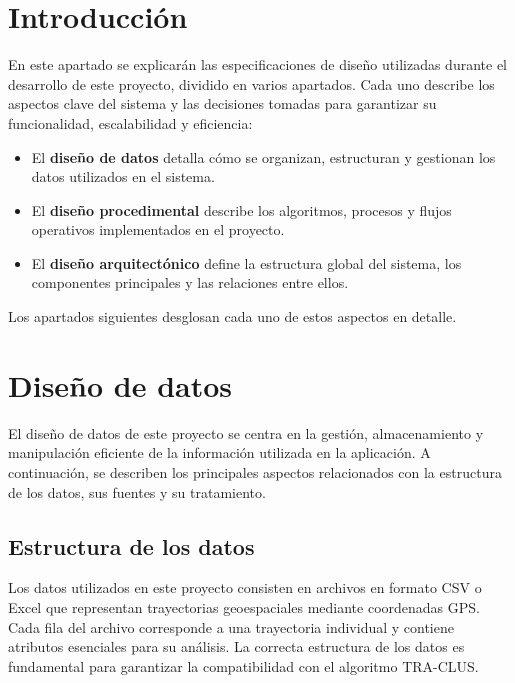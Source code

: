
\section{Introducción}

En este apartado se explicarán las especificaciones de diseño utilizadas durante el desarrollo de este proyecto, dividido en varios apartados. Cada uno describe los aspectos clave del sistema y las decisiones tomadas para garantizar su funcionalidad, escalabilidad y eficiencia:

\begin{itemize}
    \item El \textbf{diseño de datos} detalla cómo se organizan, estructuran y gestionan los datos utilizados en el sistema.
    \item El \textbf{diseño procedimental} describe los algoritmos, procesos y flujos operativos implementados en el proyecto.
    \item El \textbf{diseño arquitectónico} define la estructura global del sistema, los componentes principales y las relaciones entre ellos.
\end{itemize}

Los apartados siguientes desglosan cada uno de estos aspectos en detalle.

\section{Diseño de datos}

El diseño de datos de este proyecto se centra en la gestión, almacenamiento y manipulación eficiente de la información utilizada en la aplicación. A continuación, se describen los principales aspectos relacionados con la estructura de los datos, sus fuentes y su tratamiento.

\subsection{Estructura de los datos}

Los datos utilizados en este proyecto consisten en archivos en formato CSV o Excel que representan trayectorias geoespaciales mediante coordenadas GPS. Cada fila del archivo corresponde a una trayectoria individual y contiene atributos esenciales para su análisis. La correcta estructura de los datos es fundamental para garantizar la compatibilidad con el algoritmo TRA-CLUS.

